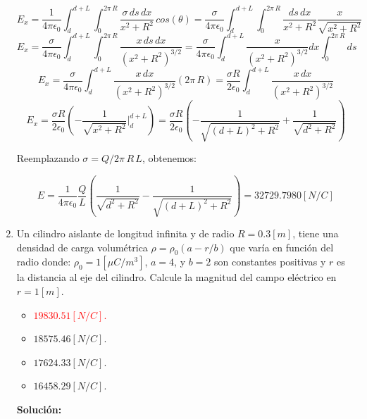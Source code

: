 \documentclass[letter,11pt]{article}
\begin{document}
\begin{enumerate}
\begin{equation*}
    E_x = \frac{1}{4\pi\epsilon_0}\int_{d}^{d+L}\int_{0}^{2\pi\,R}\frac{\sigma\,ds\,dx}{x^2+R^2}\,cos(\theta)
        = \frac{\sigma}{4\pi\epsilon_0}\int_{d}^{d+L}\int_{0}^{2\pi\,R}\frac{ds\,dx}{x^2+R^2}\frac{x}{\sqrt{x^2+R^2}}
\end{equation*}
\begin{equation*}
    E_x = \frac{\sigma}{4\pi\epsilon_0}\int_{d}^{d+L}\int_{0}^{2\pi\,R}\frac{x\,ds\,dx}{(x^2+R^2)^{3/2}}
        = \frac{\sigma}{4\pi\epsilon_0}\int_{d}^{d+L}\frac{x}{(x^2+R^2)^{3/2}}dx\int_{0}^{2\pi\,R}ds
\end{equation*}
\begin{equation*}
    E_x = \frac{\sigma}{4\pi\epsilon_0}\int_{d}^{d+L}\frac{x\,dx}{(x^2+R^2)^{3/2}}(2\pi\,R)
        = \frac{\sigma R}{2\epsilon_0}\int_{d}^{d+L}\frac{x\,dx}{(x^2+R^2)^{3/2}}
\end{equation*}
\begin{equation*}
    E_x = \frac{\sigma R}{2\epsilon_0}\left(-\frac{1}{\sqrt{x^2+R^2}}\Biggr|_{d}^{d+L}\right)
        = \frac{\sigma R}{2\epsilon_0}\left(-\frac{1}{\sqrt{(d+L)^2+R^2}}+\frac{1}{\sqrt{d^2+R^2}}\right)
\end{equation*}

Reemplazando $\sigma = Q/2\pi\,R\,L$, obtenemos:

\begin{equation*}
    E = \frac{1}{4\pi\epsilon_0}\frac{Q}{L}\left(\frac{1}{\sqrt{d^2+R^2}}-\frac{1}{\sqrt{(d+L)^2+R^2}}\right)
      = 32729.7980 [N/C]
\end{equation*}

\item  Un cilindro aislante de longitud infinita y de radio $R = 0.3 [m]$, tiene
una densidad de carga volumétrica $\rho = \rho_0 (a - r/b )$ que varía en
función del radio donde: $\rho_0 = 1 [\mu C/m^3]$, $a = 4$, y $b = 2$ son
constantes positivas y $r$ es la distancia al eje del cilindro. Calcule la
magnitud del campo eléctrico en $r = 1 [m]$.

\begin{itemize}
    \item \textcolor{red}{$19830.51 [N/C]$.}
    \item $18575.46 [N/C]$.
    \item $17624.33 [N/C]$.
    \item $16458.29 [N/C]$.
\end{itemize}

\textbf{Solución:} \\


\end{enumerate}
\end{document}
